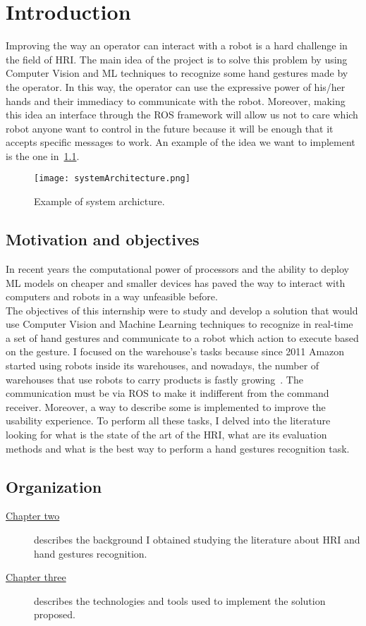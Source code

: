 \documentclass[../thesis.tex]{subfiles}
\begin{document}
\chapter{Introduction}\label{cap:introduction}
Improving the way an operator can interact with a robot is a hard challenge in the field of \acrfull{HRI}. The main idea of the project is to solve this problem by using Computer Vision and \acrfull{ML} techniques to recognize some hand gestures made by the operator. In this way, the operator can use the expressive power of his/her hands and their immediacy to communicate with the robot. Moreover, making this idea an interface through the \acrfull{ROS} framework will allow us not to care which robot anyone want to control in the future because it will be enough that it accepts specific messages to work. An example of the idea we want to implement is the one in~\ref{fig:systemArchitecture}.

\begin{figure}[H]
  \centering
  \texttt{[image: systemArchitecture.png]}
  \caption{Example of system archicture.}
  \label{fig:systemArchitecture}
\end{figure}

\section{Motivation and objectives}\label{s:motivation-and-objectives}
In recent years the computational power of processors and the ability to deploy \acrshort{ML} models on cheaper and smaller devices has paved the way to interact with computers and robots in a way unfeasible before.\\
The objectives of this internship were to study and develop a solution that would use Computer Vision and Machine Learning techniques to recognize in real-time a set of hand gestures and communicate to a robot which action to execute based on the gesture. I focused on the warehouse's tasks because since 2011 Amazon started using robots inside its warehouses, and nowadays, the number of warehouses that use robots to carry products is fastly growing~\cite{article:bogue2016}. The communication must be via \acrshort{ROS} to make it indifferent from the command receiver. Moreover, a way to describe some  is implemented to improve the usability experience. To perform all these tasks, I delved into the literature looking for what is the state of the art of the \acrshort{HRI}, what are its evaluation methods and what is the best way to perform a hand gestures recognition task.

\section{Organization}\label{s:organization}
\begin{description}
    \item[{\hyperref[cap:background]{Chapter two}}] describes the background I obtained studying the literature about \acrlong{HRI} and hand gestures recognition.
    \item[{\hyperref[cap:technologies-and-tools]{Chapter three}}] describes the technologies and tools used to implement the solution proposed.
\end{description}
\end{document}
